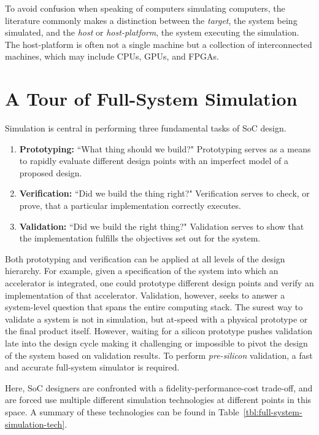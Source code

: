 To avoid confusion when speaking of computers simulating computers, the
literature commonly makes a distinction between the \emph{target}, the system
being simulated, and the \emph{host} or \emph{host-platform}, the system
executing the simulation. The host-platform is often not a single machine but
a collection of interconnected machines, which may include CPUs,
GPUs, and FPGAs.

\section{A Tour of Full-System Simulation}

Simulation is central in performing three fundamental tasks of SoC design.

\begin{enumerate}

    \item \textbf{Prototyping:} ``What thing should we
        build?" Prototyping serves as a means to rapidly evaluate different
        design points with an imperfect model of a proposed design.

    \item \textbf{Verification:} ``Did we build the thing right?" Verification
        serves to check, or prove, that a particular implementation
        correctly executes.

    \item \textbf{Validation:} ``Did we build the right thing?" Validation
        serves to show that the implementation fulfills the objectives set out
        for the system.

\end{enumerate}

Both prototyping and verification can be applied at all levels of the design
hierarchy.  For example, given a specification of the system into which an
accelerator is integrated, one could prototype different design points and
verify an implementation of that accelerator. Validation, however, seeks to
answer a system-level question that spans the entire computing stack.  The
surest way to validate a system is not in simulation, but at-speed with a
physical prototype or the final product itself. However, waiting for a silicon
prototype pushes validation late into the design cycle making it challenging or
impossible to pivot the design of the system based on validation results. To
perform \emph{pre-silicon} validation, a fast and accurate full-system
simulator is required.

Here, SoC designers are confronted with a fidelity-performance-cost trade-off,
and are forced use multiple different simulation technologies at different
points in this space. A summary of these technologies can be found in
Table~\ref{tbl:full-system-simulation-tech}.

